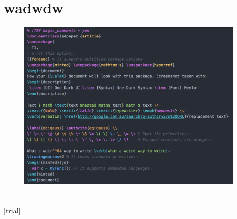 \documentclass{article}
\begin{document}

\section{wadwdw}







\begin{figure}[h t p b] %
  \centering
  \includegraphics[width=\textwidth]{./fig1}
\caption{}
  \label{}
\end{figure}
\section{}

\ref{trial}

\cite{world}
\end{document}
